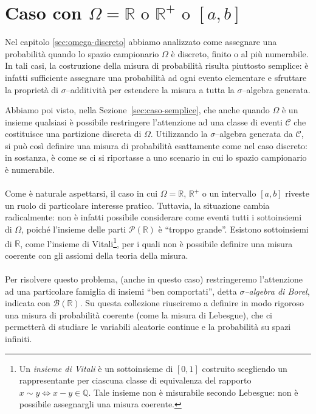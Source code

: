 \section{Caso con \(\Omega = \mathbb{R}\text{ o }\mathbb{R^+}\text{ o }[a, b]\)}
Nel capitolo \ref{sec:omega-discreto} abbiamo analizzato come assegnare una probabilità quando lo spazio campionario $\Omega$ è discreto, finito o al più numerabile. In tali casi, la costruzione della misura di probabilità risulta piuttosto semplice: è infatti sufficiente assegnare una probabilità ad ogni evento elementare e sfruttare la proprietà di $\sigma$--additività per estendere la misura a tutta la $\sigma$--algebra generata.\medskip

\noindent Abbiamo poi visto, nella Sezione~\ref{sec:caso-semplice}, che anche quando $\Omega$ è un insieme qualsiasi è possibile restringere l’attenzione ad una classe di eventi $\mathcal{C}$ che costituisce una partizione discreta di $\Omega$. Utilizzando la $\sigma$--algebra generata da $\mathcal{C}$, si può così definire una misura di probabilità esattamente come nel caso discreto: in sostanza, è come se ci si riportasse a uno scenario in cui lo spazio campionario è numerabile.\\
\\
Come è naturale aspettarsi, il caso in cui $\Omega = \mathbb{R}$, $\mathbb{R}^+$ o un intervallo $[a,b]$ riveste un ruolo di particolare interesse pratico. Tuttavia, la situazione cambia radicalmente: non è infatti possibile considerare come eventi tutti i sottoinsiemi di $\Omega$, poiché l’insieme delle parti $\mathcal{P}(\mathbb{R})$ è “troppo grande”. Esistono sottoinsiemi di $\mathbb{R}$, come l’insieme di Vitali\footnote{Un \emph{insieme di Vitali} è un sottoinsieme di $[0,1]$ costruito scegliendo un rappresentante per ciascuna classe di equivalenza del rapporto $x \sim y \iff x - y \in \mathbb{Q}$. Tale insieme non è misurabile secondo Lebesgue: non è possibile assegnargli una misura coerente.}, per i quali non è possibile definire una misura coerente con gli assiomi della teoria della misura. \\
\\
Per risolvere questo problema, (anche in questo caso) restringeremo l’attenzione ad una particolare famiglia di insiemi ``ben comportati”, detta \emph{$\sigma$--algebra di Borel}, indicata con $\mathcal{B}(\mathbb{R})$.
Su questa collezione riusciremo a definire in modo rigoroso una misura di probabilità coerente (come la misura di Lebesgue), che ci permetterà di studiare le variabili aleatorie continue e la probabilità su spazi infiniti.
